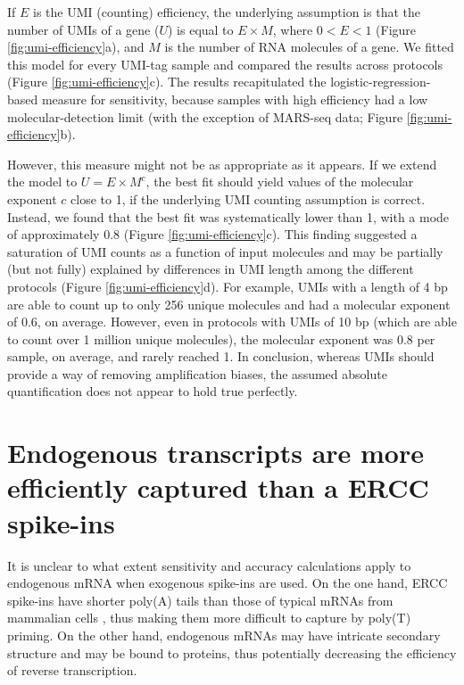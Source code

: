 If \( E \) is the UMI (counting) efficiency, the underlying assumption is that the number of UMIs of a gene (\( U \)) is equal to \( E \times M \), where \( 0 < E < 1 \) (Figure \ref{fig:umi-efficiency}a), and \( M \) is the number of RNA molecules of a gene. We fitted this model for every UMI-tag sample and compared the results across protocols (Figure \ref{fig:umi-efficiency}c). The results recapitulated the logistic-regression-based measure for sensitivity, because samples with high efficiency had a low molecular-detection limit (with the exception of MARS-seq data; Figure \ref{fig:umi-efficiency}b).

However, this measure might not be as appropriate as it appears. If we extend the model to \( U = E \times M^c \), the best fit should yield values of the molecular exponent \( c \) close to 1, if the underlying UMI counting assumption is correct. Instead, we found that the best fit was systematically lower than 1, with a mode of approximately 0.8 (Figure \ref{fig:umi-efficiency}c). This finding suggested a saturation of UMI counts as a function of input molecules and may be partially (but not fully) explained by differences in UMI length among the different protocols (Figure \ref{fig:umi-efficiency}d). For example, UMIs with a length of 4 bp are able to count up to only 256 unique molecules and had a molecular exponent of 0.6, on average. However, even in protocols with UMIs of 10 bp (which are able to count over 1 million unique molecules), the molecular exponent was 0.8 per sample, on average, and rarely reached 1. In conclusion, whereas UMIs should provide a way of removing amplification biases, the assumed absolute quantification does not appear to hold true perfectly.

\section{Endogenous transcripts are more efficiently captured than a ERCC spike-ins}

It is unclear to what extent sensitivity and accuracy calculations apply to endogenous mRNA when exogenous spike-ins are used. On the one hand, ERCC spike-ins have shorter poly(A) tails than those of typical mRNAs from mammalian cells \cite{Viphakone2008-kh}, thus making them more difficult to capture by poly(T) priming. On the other hand, endogenous mRNAs may have intricate secondary structure and may be bound to proteins, thus potentially decreasing the efficiency of reverse transcription.

